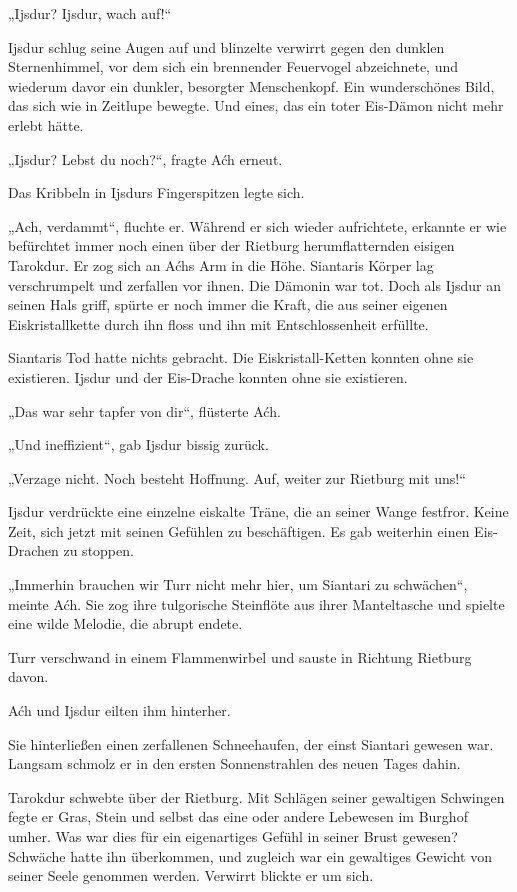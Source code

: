 „Ijsdur? Ijsdur, wach auf!“

Ijsdur schlug seine Augen auf und blinzelte verwirrt gegen den dunklen Sternenhimmel, vor dem sich ein brennender Feuervogel abzeichnete, und wiederum davor ein dunkler, besorgter Menschenkopf. Ein wunderschönes Bild, das sich wie in Zeitlupe bewegte. Und eines, das ein toter Eis-Dämon nicht mehr erlebt hätte.

„Ijsdur? Lebst du noch?“, fragte Aćh erneut.

Das Kribbeln in Ijsdurs Fingerspitzen legte sich.

„Ach, verdammt“, fluchte er. Während er sich wieder aufrichtete, erkannte er wie befürchtet immer noch einen über der Rietburg herumflatternden eisigen Tarokdur. Er zog sich an Aćhs Arm in die Höhe. Siantaris Körper lag verschrumpelt und zerfallen vor ihnen. Die Dämonin war tot. Doch als Ijsdur an seinen Hals griff, spürte er noch immer die Kraft, die aus seiner eigenen Eiskristallkette durch ihn floss und ihn mit Entschlossenheit erfüllte.

Siantaris Tod hatte nichts gebracht. Die Eiskristall-Ketten konnten ohne sie existieren. Ijsdur und der Eis-Drache konnten ohne sie existieren.

„Das war sehr tapfer von dir“, flüsterte Aćh.

„Und ineffizient“, gab Ijsdur bissig zurück.

„Verzage nicht. Noch besteht Hoffnung. Auf, weiter zur Rietburg mit uns!“

Ijsdur verdrückte eine einzelne eiskalte Träne, die an seiner Wange festfror. Keine Zeit, sich jetzt mit seinen Gefühlen zu beschäftigen. Es gab weiterhin einen Eis-Drachen zu stoppen.

„Immerhin brauchen wir Turr nicht mehr hier, um Siantari zu schwächen“, meinte Aćh. Sie zog ihre tulgorische Steinflöte aus ihrer Manteltasche und spielte eine wilde Melodie, die abrupt endete.

Turr verschwand in einem Flammenwirbel und sauste in Richtung Rietburg davon.

Aćh und Ijsdur eilten ihm hinterher.

Sie hinterließen einen zerfallenen Schneehaufen, der einst Siantari gewesen war. Langsam schmolz er in den ersten Sonnenstrahlen des neuen Tages dahin.\bigskip







Tarokdur schwebte über der Rietburg. Mit Schlägen seiner gewaltigen Schwingen fegte er Gras, Stein und selbst das eine oder andere Lebewesen im Burghof umher. Was war dies für ein eigenartiges Gefühl in seiner Brust gewesen? Schwäche hatte ihn überkommen, und zugleich war ein gewaltiges Gewicht von seiner Seele genommen werden. Verwirrt blickte er um sich.

